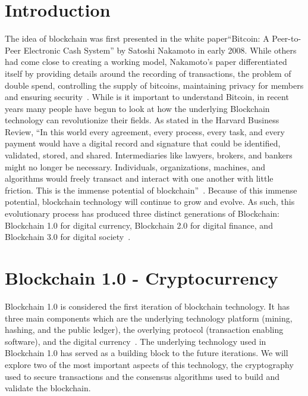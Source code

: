 \section{Introduction}
The idea of blockchain was first presented in the white paper``Bitcoin: A Peer-to-Peer Electronic Cash System'' by Satoshi Nakamoto in early 2008. While others had come close to creating a working model, Nakamoto’s paper differentiated itself by providing details around the recording of transactions, the problem of double spend, controlling the supply of bitcoins, maintaining privacy for members and ensuring security~\cite{hid-sp18-414-www-blockchain-theory-application}. While is it important to understand Bitcoin, in recent years many people have begun to look at how the underlying Blockchain technology can revolutionize their fields.  As stated in the Harvard Business Review, ``In this world every agreement, every process, every task, and every payment would have a digital record and signature that could be identified, validated, stored, and shared. Intermediaries like lawyers, brokers, and bankers might no longer be necessary. Individuals, organizations, machines, and algorithms would freely transact and interact with one another with little friction. This is the immense potential of blockchain''~\cite{hid-sp18-414-Truth-Blockchain}. Because of this immense potential, blockchain technology will continue to grow and evolve.  As such, this evolutionary process has produced three distinct generations of Blockchain: Blockchain 1.0 for digital currency, Blockchain 2.0 for digital finance, and Blockchain 3.0 for digital society~\cite{hid-sp18-414-financialinnovation-zhao}.

\section{Blockchain 1.0 - Cryptocurrency}

Blockchain 1.0 is considered the first iteration of blockchain technology. It has three main components which are the underlying technology platform (mining, hashing, and the public ledger), the overlying protocol (transaction enabling software), and the digital currency~\cite{hid-sp18-414-www-promise-bitcoin-blockchain}. The underlying technology used in Blockchain 1.0 has served as a building block to the future iterations. We will explore two of the most important aspects of this technology, the cryptography used to secure transactions and the consensus algorithms used to build and validate the blockchain. 

